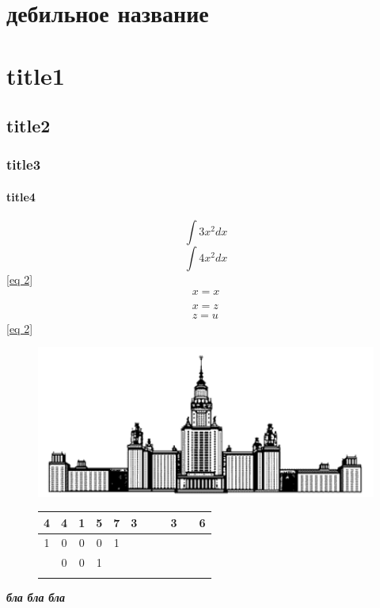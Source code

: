 \documentclass[a4paper,12pt]{article}
\begin{document}
	
	\newpage
	
	\tableofcontents %
	\section*{дебильное название} %
	\section{title1}	
	\subsection{title2}
	\subsubsection{title3}
	\paragraph{title4}
	\begin{equation}		
		\int 3x^2dx
		\label {eq 1}
	\end{equation}
	\[
	\int 4x^2 dx
	\]
	\eqref{eq 2}
	\begin{eqnarray}
		x = x \\ \label{eq 2} \\
		x = z \\
		z = u  
	\end{eqnarray}
	\eqref{eq 2}
	\begin{figure}[H]
		\centering
		\includegraphics[width=0.7\linewidth]{msu_logo}
		\caption{}
		\label{fig:msulogo}
	\end{figure}
	\begin{figure} [H]
		\begin{tabular}{|c|c|c|c|cllllll}
			\hline
			4 & 4 & 1 & 5 & 7 & 3& & &3 & & 6 \\
			\hline
			1 & 0 & 0 & 0 & 1 & & & & & & \\
			\hline
			& 0 & 0 & 1 &  & & & & & & \\
			\hline& & & & & & & & & & 
		\end{tabular}
		\centering
	\end{figure}
	\textit{\textbf{бла бла бла}}
	
	
	
\end{document}
